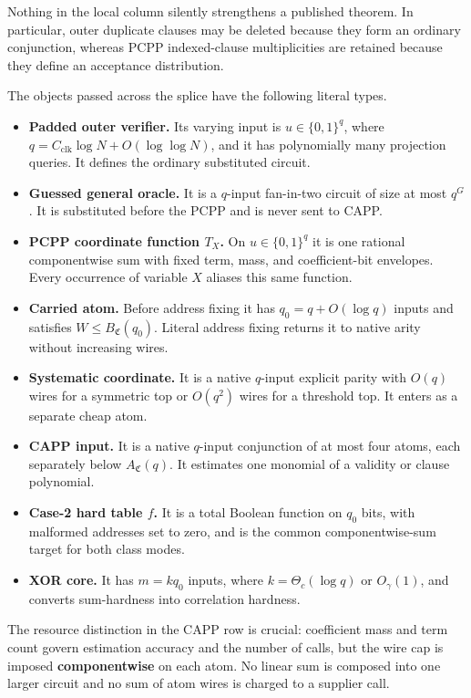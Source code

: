 \documentclass[11pt,letterpaper]{article}
\theoremstyle{definition}
\theoremstyle{remark}
\begin{document}
Nothing in the local column silently strengthens a published theorem. In
particular, outer duplicate clauses may be deleted because they form an
ordinary conjunction, whereas PCPP indexed-clause multiplicities are
retained because they define an acceptance distribution.

The objects passed across the splice have the following literal types.

\begin{itemize}
\item
  \textbf{Padded outer verifier.} Its varying input is
  \(u\in\{0,1\}^q\), where \(q=C_{\mathrm{clk}}\log N+O(\log\log N)\), and it has
  polynomially many projection queries. It defines the ordinary
  substituted circuit.
\item
  \textbf{Guessed general oracle.} It is a \(q\)-input fan-in-two
  circuit of size at most \(q^G\). It is substituted before the PCPP and
  is never sent to CAPP.
\item
  \textbf{PCPP coordinate function \(T_X\).} On \(u\in\{0,1\}^q\) it is
  one rational componentwise sum with fixed term, mass, and
  coefficient-bit envelopes. Every occurrence of variable \(X\) aliases
  this same function.
\item
  \textbf{Carried atom.} Before address fixing it has
  \(q_0=q+O(\log q)\) inputs and satisfies
  \(W\le B_{\mathfrak C}(q_0)\). Literal address fixing returns it to
  native arity without increasing wires.
\item
  \textbf{Systematic coordinate.} It is a native \(q\)-input explicit
  parity with \(O(q)\) wires for a symmetric top or \(O(q^2)\) wires for
  a threshold top. It enters as a separate cheap atom.
\item
  \textbf{CAPP input.} It is a native \(q\)-input conjunction of at most
  four atoms, each separately below \(A_{\mathfrak C}(q)\). It estimates
  one monomial of a validity or clause polynomial.
\item
  \textbf{Case-2 hard table \(f\).} It is a total Boolean function on
  \(q_0\) bits, with malformed addresses set to zero, and is the common
  componentwise-sum target for both class modes.
\item
  \textbf{XOR core.} It has \(m=kq_0\) inputs, where
  \(k=\Theta_c(\log q)\) or \(O_\gamma(1)\), and converts sum-hardness
  into correlation hardness.
\end{itemize}

The resource distinction in the CAPP row is crucial: coefficient mass
and term count govern estimation accuracy and the number of calls, but
the wire cap is imposed \textbf{componentwise} on each atom. No linear
sum is composed into one larger circuit and no sum of atom wires is
charged to a supplier call.
\end{document}
